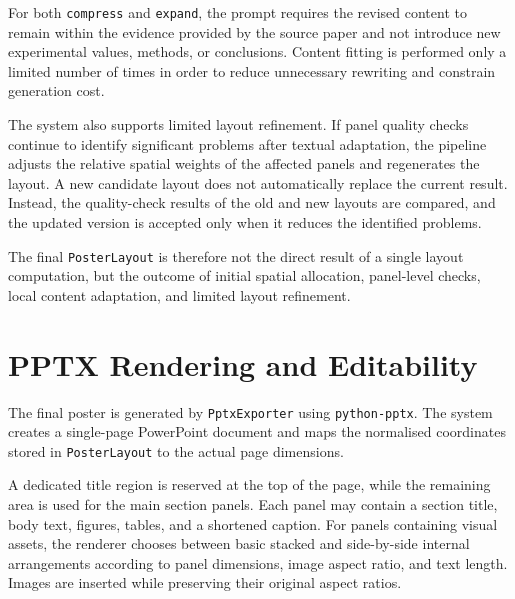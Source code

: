 \documentclass[12pt,oneside]{report}
\begin{document}
\vspace{1em}

For both \texttt{compress} and \texttt{expand}, the prompt requires the revised content to remain within the evidence provided by the source paper and not introduce new experimental values, methods, or conclusions. Content fitting is performed only a limited number of times in order to reduce unnecessary rewriting and constrain generation cost.

\vspace{1em}

The system also supports limited layout refinement. If panel quality checks continue to identify significant problems after textual adaptation, the pipeline adjusts the relative spatial weights of the affected panels and regenerates the layout. A new candidate layout does not automatically replace the current result. Instead, the quality-check results of the old and new layouts are compared, and the updated version is accepted only when it reduces the identified problems.

\vspace{1em}

The final \texttt{PosterLayout} is therefore not the direct result of a single layout computation, but the outcome of initial spatial allocation, panel-level checks, local content adaptation, and limited layout refinement.

\section{PPTX Rendering and Editability}

The final poster is generated by \texttt{PptxExporter} using \texttt{python-pptx}. The system creates a single-page PowerPoint document and maps the normalised coordinates stored in \texttt{PosterLayout} to the actual page dimensions.

\vspace{1em}

A dedicated title region is reserved at the top of the page, while the remaining area is used for the main section panels. Each panel may contain a section title, body text, figures, tables, and a shortened caption. For panels containing visual assets, the renderer chooses between basic stacked and side-by-side internal arrangements according to panel dimensions, image aspect ratio, and text length. Images are inserted while preserving their original aspect ratios.

\vspace{1em}
\end{document}
